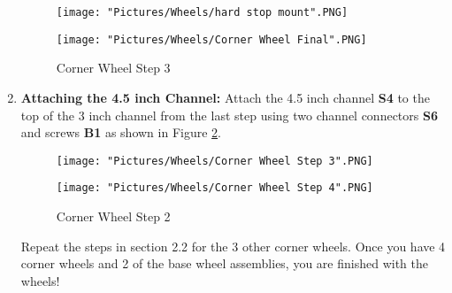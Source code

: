 \documentclass[12pt]{article}
\begin{document}
\begin{enumerate}
\begin{figure}[H]
  \centering
  \begin{minipage}[b]{0.45\textwidth}
    \texttt{[image: "Pictures/Wheels/hard stop mount".PNG]}
  \end{minipage}
  \hfill
  \begin{minipage}[b]{0.45\textwidth}
    \texttt{[image: "Pictures/Wheels/Corner Wheel Final".PNG]}
  \end{minipage}
  \caption{Corner Wheel Step 3}
  \label{corner wheel step 3}
\end{figure}


\item \textbf{Attaching the 4.5 inch Channel:} Attach the 4.5 inch channel \textbf{S4} to the top of the 3 inch channel from the last step using two channel connectors \textbf{S6} and screws \textbf{B1} as shown in Figure \ref{corner wheel step 2}.

\begin{figure}[H]
  \centering
  \begin{minipage}[b]{0.45\textwidth}
    \texttt{[image: "Pictures/Wheels/Corner Wheel Step 3".PNG]}
  \end{minipage}
  \hfill
  \begin{minipage}[b]{0.45\textwidth}
    \texttt{[image: "Pictures/Wheels/Corner Wheel Step 4".PNG]}
  \end{minipage}
  \caption{Corner Wheel Step 2}
  \label{corner wheel step 2}
\end{figure}

Repeat the steps in section 2.2 for the 3 other corner wheels.  Once you have 4 corner wheels and 2 of the base wheel assemblies, you are finished with the wheels!

\end{enumerate}
\end{document}

